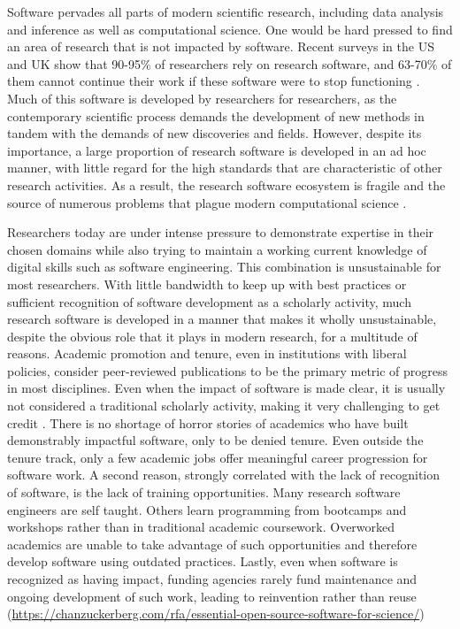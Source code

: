 \documentclass[
]{book}
\begin{document}
Software pervades all parts of modern scientific research, including data analysis and inference as well as computational science. One would be hard pressed to find an area of research that is not impacted by software. Recent surveys in the US and UK show that 90-95\% of researchers rely on research software, and 63-70\% of them cannot continue their work if these software were to stop functioning \citep{hettrick2014}. Much of this software is developed by researchers for researchers, as the contemporary scientific process demands the development of new methods in tandem with the demands of new discoveries and fields. However, despite its importance, a large proportion of research software is developed in an ad hoc manner, with little regard for the high standards that are characteristic of other research activities. As a result, the research software ecosystem is fragile and the source of numerous problems that plague modern computational science \citep{carver2018conceptualization}.

Researchers today are under intense pressure to demonstrate expertise in their chosen domains while also trying to maintain a working current knowledge of digital skills such as software engineering.
This combination is unsustainable for most researchers. With little bandwidth to keep up with best practices or sufficient recognition of software development as a scholarly activity, much research software is developed in a manner that makes it wholly unsustainable, despite the obvious role that it plays in modern research, for a multitude of reasons. Academic promotion and tenure, even in institutions with liberal policies, consider peer-reviewed publications to be the primary metric of progress in most disciplines. Even when the impact of software is made clear, it is usually not considered a traditional scholarly activity, making it very challenging to get credit \citep{df80bc12-en}. There is no shortage of horror stories of academics who have built demonstrably impactful software, only to be denied tenure.
Even outside the tenure track, only a few academic jobs offer meaningful career progression for software work. A second reason, strongly correlated with the lack of recognition of software, is the lack of training opportunities. Many research software engineers are self taught. Others learn programming from bootcamps and workshops rather than in traditional academic coursework. Overworked academics are unable to take advantage of such opportunities and therefore develop software using outdated practices. Lastly, even when software is recognized as having impact, funding agencies rarely fund maintenance and ongoing development of such work, leading to reinvention rather than reuse (\url{https://chanzuckerberg.com/rfa/essential-open-source-software-for-science/})
\end{document}
